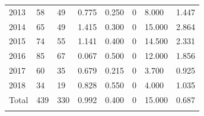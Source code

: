 \documentclass[12pt]{article}
\begin{document}
\begin{table} [ht]
\begin{tabular}{p{3.2cm} p{1.2cm} p{1.2cm} p{1.2cm} p{1.2cm} p{1.2cm} p{1.2cm} p{1.2cm}}
2013 & 58 & 49 & 0.775 & 0.250 & 0 & 8.000 & 1.447 \\
2014 & 65 & 49 & 1.415 & 0.300 & 0 & 15.000 & 2.864 \\
2015 & 74 & 55 & 1.141 & 0.400 & 0 & 14.500 & 2.331 \\
2016 & 85 & 67 & 0.067 & 0.500 & 0 & 12.000 & 1.856 \\
2017 & 60 & 35 & 0.679 & 0.215 & 0 & 3.700 & 0.925 \\
2018 & 34 & 19 & 0.828 & 0.550 & 0 & 4.000 & 1.035 \\
\cmidrule(l){2-8}
Total & 439 & 330 & 0.992 & 0.400 & 0 & 15.000 & 0.687 \\
 & & \\
\end{tabular}
\label{table3}
\end{table}
\end{document}
